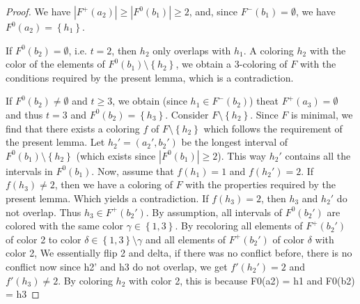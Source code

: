 \documentclass[12pt]{article}
\theoremstyle{definition}
\begin{document}
\begin{proof}
        We have $\left|F^{+}\left(a_{2}\right)\right| \geq
        \left|F^{0}\left(b_1\right)\right| \geq 2$,
        and, since $F^{-}\left(b_1\right) = \emptyset$,
        we have $F^{0}\left(a_2\right)
        = \left\{h_1\right\}$.
        
        If $F^{0}\left(b_2\right) = \emptyset$,
        i.e. $t=2$, then $h_2$
        only overlaps with $h_1$.
        A coloring $h_2$ with the color
        of the elements of $F^{0}\left(b_1\right)
        \setminus \left\{h_2\right\}$,
        we obtain a 3-coloring of $F$ with
        the conditions required by
        the present lemma, which is a
        contradiction.
        
        If $F^{0}\left(b_2\right) \neq \emptyset$
        and $t \geq 3$,
        we obtain (since $h_1 \in
        F^{-}\left(b_2\right)$)
        theat $F^{+}\left(a_3\right)=\emptyset$ 
        and thus $t=3$
        and $F^{0}\left(b_2\right) = \left\{h_3\right\}$.
        Consider $F \setminus \left\{h_2\right\}$.
        Since $F$ is minimal,
        we find that there exists
        a coloring $f$ of $F \setminus \left\{h_2\right\}$
        which follows the requirement
        of the present lemma.
        Let $h_2' = \left(a_2', b_2'\right)$
        be the longest interval of 
        $F^{0}\left(b_1\right) \setminus \left\{h_2\right\}$
        (which exists since $\left|F^{0}\left(b_1\right)\right|
        \geq 2$). This way
        $h_2'$ contains all
        the intervals in
        $F^{0}\left(b_1\right)$.
        Now, assume that $f\left(h_1\right) = 1$
        and $f\left(h_2'\right) = 2$.
        If $f\left(h_3\right)\neq 2$,
        then we have a coloring 
        of $F$ with the properties
        required by the present lemma.
        Which yields a contradiction.
        If $f\left(h_3\right) = 2$,
        then $h_3$ and $h_2'$
        do not overlap. Thus $h_3 \in F^{+}\left(b_2'\right)$.
        By assumption, all intervals
        of $F^{0}\left(b_2'\right)$ 
        are colored with the same color
        $\gamma \in \left\{1,3\right\}$.
        By recoloring all elements
        of $F^{+}\left(b_2'\right)$
        of color 2 to color 
        $\delta \in \left\{1,3\right\}
        \setminus \gamma$
        and all elements of $F^{+}\left(b_2'\right)$ 
        of color $\delta$ with color 2,
        {We essentially flip 2 and delta,
        if there was no conflict
        before, there is no conflict
        now} 
        {since h2' and h3 do not
        overlap}, we get
        $f'\left(h_2'\right)=2$ and
        $f'\left(h_3\right) \neq 2$.
        By coloring $h_2$ with
        color 2, 
        {this is because F0(a2)
        = {h1} and
        F0(b2) = {h3}}
    \end{proof}
    
\end{document}

